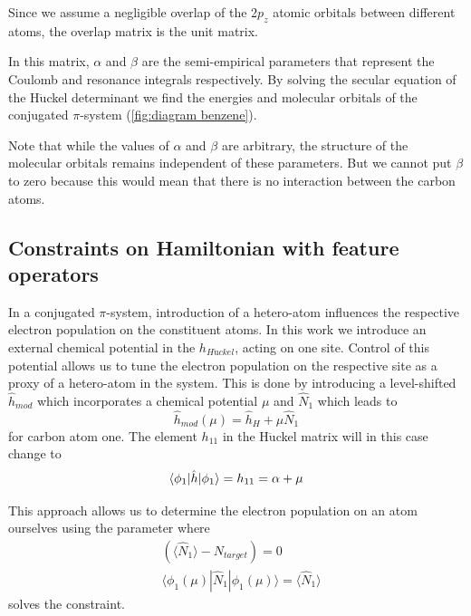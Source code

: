 \documentclass[twoside,twocolumn,9pt]{article}
\begin{document}
Since we assume a negligible overlap of the 2$p_z$ atomic orbitals between different atoms, the overlap matrix is the unit matrix.

In this matrix, $\alpha$ and $\beta$ are the semi-empirical parameters that represent the Coulomb and resonance integrals respectively. By solving the secular equation of the H$\ddot{\text{u}}$ckel determinant we find the energies and molecular orbitals of the conjugated $\pi$-system (\cref{fig:diagram benzene}). 

Note that while the values of $\alpha$ and $\beta$ are arbitrary, the structure of the molecular orbitals remains independent of these parameters. But we cannot put $\beta$ to zero because this would mean that there is no interaction between the carbon atoms. 

\subsection{Constraints on Hamiltonian with feature operators}
In a conjugated $\pi$-system, introduction of a hetero-atom influences the respective electron population on the constituent atoms. In this work we introduce an external chemical potential in the $h_{H\ddot{\text{u}}ckel}$, acting on one site. Control of this potential allows us to tune the electron population on the respective site as a proxy of a hetero-atom in the system.
This is done by introducing a level-shifted $\hat{h}_{mod}$ which incorporates a chemical potential $\mu$ and $\hat{N}_1$ which leads to 
\begin{equation}
  \hat{h}_{mod}(\mu) = \hat{h}_H + \mu\hat{N}_1
  \label{constraining hamiltonian}
\end{equation}
for carbon atom one.
The element $h_{11}$ in the H$\ddot{\text{u}}$ckel matrix will in this case change to 
\begin{equation}
    \langle \phi_1 | \hat{h} | \phi_1 \rangle = h_{11} = \alpha + \mu\\
\end{equation}

This approach allows us to determine the electron population on an atom ourselves using the parameter where 
\begin{equation}
  \begin{aligned}
  &(\langle \hat{N}_1 \rangle - N_{target}) = 0 \\
  &\langle \phi_1(\mu) | \hat{N}_1 | \phi_1(\mu) \rangle = \langle \hat{N}_1 \rangle 
  \end{aligned}
\end{equation}
solves the constraint.
\end{document}
